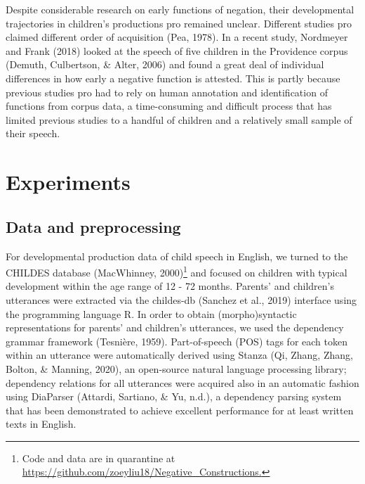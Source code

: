 \documentclass[
  english,
  man,floatsintext]{apa6}
\begin{document}
Despite considerable research on early functions of negation, their developmental trajectories in children's productions pro remained unclear. Different studies pro claimed different order of acquisition (Pea, 1978). In a recent study, Nordmeyer and Frank (2018) looked at the speech of five children in the Providence corpus (Demuth, Culbertson, \& Alter, 2006) and found a great deal of individual differences in how early a negative function is attested. This is partly because previous studies pro had to rely on human annotation and identification of functions from corpus data, a time-consuming and difficult process that has limited previous studies to a handful of children and a relatively small sample of their speech.

\clearpage

\hypertarget{experiments}{%
\section{Experiments}\label{experiments}}

\hypertarget{data-and-preprocessing}{%
\subsection{Data and preprocessing}\label{data-and-preprocessing}}

For developmental production data of child speech in English, we turned to the CHILDES database (MacWhinney, 2000)\footnote{Code and data are in quarantine at \url{https://github.com/zoeyliu18/Negative_Constructions.}} and focused on children with typical development within the age range of 12 - 72 months. Parents' and children's utterances were extracted via the childes-db (Sanchez et al., 2019) interface using the programming language R. In order to obtain (morpho)syntactic representations for parents' and children's utterances, we used the dependency grammar framework (Tesnière, 1959). Part-of-speech (POS) tags for each token within an utterance were automatically derived using Stanza (Qi, Zhang, Zhang, Bolton, \& Manning, 2020), an open-source natural language processing library; dependency relations for all utterances were acquired also in an automatic fashion using DiaParser (Attardi, Sartiano, \& Yu, n.d.), a dependency parsing system that has been demonstrated to achieve excellent performance for at least written texts in English.
\end{document}
